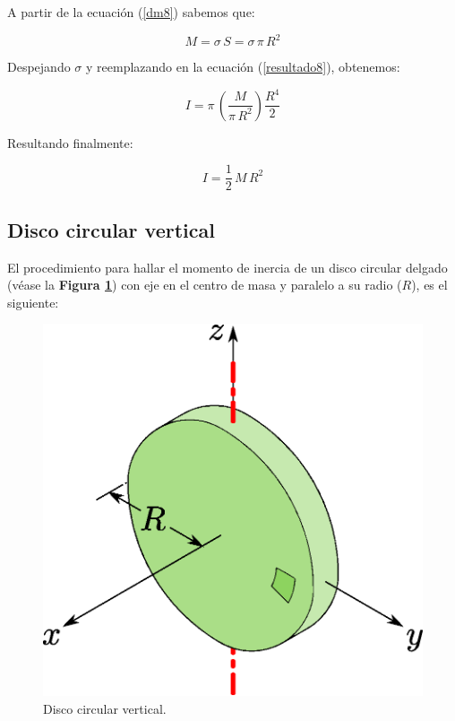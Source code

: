 \documentclass[letter,oneside,11pt]{article}
\begin{document}
A partir de la ecuación (\ref{dm8}) sabemos que:

\begin{equation*}
    M = \sigma\, S = \sigma\, \pi\, R^2
\end{equation*}

Despejando $\sigma$ y reemplazando en la ecuación (\ref{resultado8}), obtenemos:

\begin{equation*}
    I = \pi\, \left( \frac{M}{\pi\, R^2} \right) \frac{R^4}{2}
\end{equation*}

Resultando finalmente:

\begin{equation}
    I = \frac{1}{2}\, M\, R^2
\end{equation}

\subsection{Disco circular vertical}
El procedimiento para hallar el momento de inercia de un disco circular delgado
(véase la \textbf{Figura \ref{figura14}}) con eje en el centro de masa y
paralelo a su radio ($R$), es el siguiente:

\begin{figure}
\centering
\includegraphics[scale=0.5]{resources/f14.eps}
\caption{Disco circular vertical.}
\label{figura14}
\end{figure}
\end{document}
